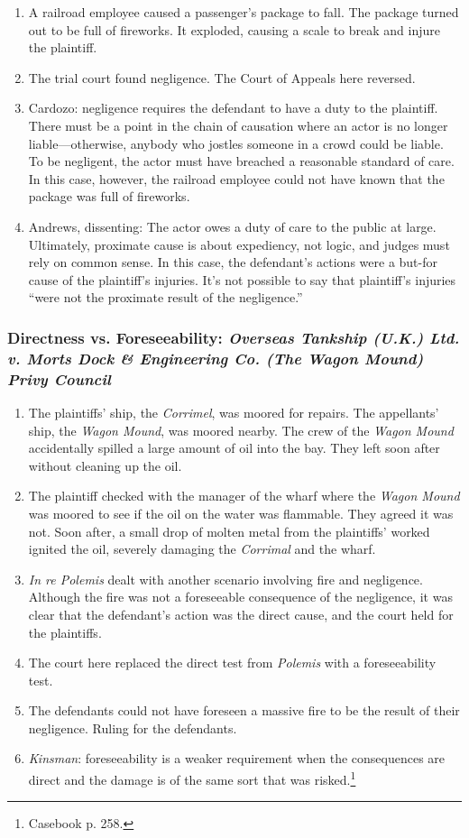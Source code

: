 \begin{enumerate}
    \item A railroad employee caused a passenger's package to fall. The package turned out to be full of fireworks. It exploded, causing a scale to break and injure the plaintiff.
    \item The trial court found negligence. The Court of Appeals here reversed.
    \item Cardozo: negligence requires the defendant to have a duty to the plaintiff. There must be a point in the chain of causation where an actor is no longer liable---otherwise, anybody who jostles someone in a crowd could be liable. To be negligent, the actor must have breached a reasonable standard of care. In this case, however, the railroad employee could not have known that the package was full of fireworks.
    \item Andrews, dissenting: The actor owes a duty of care to the public at large. Ultimately, proximate cause is about expediency, not logic, and judges must rely on common sense. In this case, the defendant's actions were a but-for cause of the plaintiff's injuries. It's not possible to say that plaintiff's injuries ``were not the proximate result of the negligence.''
\end{enumerate}

\subsubsection{Directness vs. Foreseeability: \emph{Overseas Tankship (U.K.) Ltd. v. Morts Dock \& Engineering Co. (The Wagon Mound) Privy Council}}

\begin{enumerate}
    \item The plaintiffs' ship, the \emph{Corrimel}, was moored for repairs. The appellants' ship, the \emph{Wagon Mound}, was moored nearby. The crew of the \emph{Wagon Mound} accidentally spilled a large amount of oil into the bay. They left soon after without cleaning up the oil.
    \item The plaintiff checked with the manager of the wharf where the \emph{Wagon Mound} was moored to see if the oil on the water was flammable. They agreed it was not. Soon after, a small drop of molten metal from the plaintiffs' worked ignited the oil, severely damaging the \emph{Corrimal} and the wharf.
    \item \emph{In re Polemis} dealt with another scenario involving fire and negligence. Although the fire was not a foreseeable consequence of the negligence, it was clear that the defendant's action was the direct cause, and the court held for the plaintiffs.
    \item The court here replaced the direct test from \emph{Polemis} with a foreseeability test.
    \item The defendants could not have foreseen a massive fire to be the result of their negligence. Ruling for the defendants.
    \item \emph{Kinsman}: foreseeability is a weaker requirement when the consequences are direct and the damage is of the same sort that was risked.\footnote{Casebook p. 258.}
\end{enumerate}

